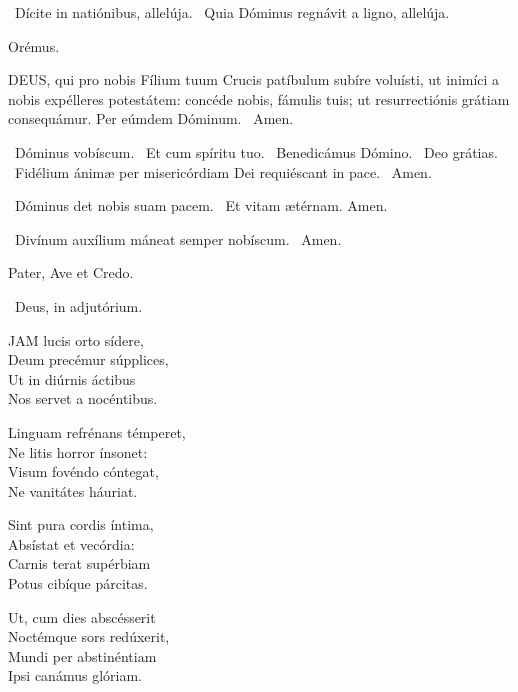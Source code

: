 \V\ Dícite in natiónibus, allelúja. \R\ Quia Dóminus regnávit a ligno, allelúja.

Orémus. 

\lettrine[lines=2]{D}{EUS}, qui pro nobis Fílium tuum Crucis patíbulum subíre voluísti, ut inimíci a nobis expélleres potestátem: concéde nobis, fámulis tuis; ut resurrectiónis grátiam consequámur. Per eúmdem Dóminum. \R\ Amen.


\V\ Dóminus vobíscum. \R\ Et cum spíritu tuo. \V\ Benedicámus Dómino. \R\ Deo grátias. \V\ Fidélium ánimæ per misericórdiam Dei requiéscant in pace. \R\ Amen.


\V\ Dóminus det nobis suam pacem. \R\ Et vitam ætérnam. Amen.



\V\ Divínum auxílium máneat semper nobíscum. \R\ Amen.


Pater, Ave et Credo.

\V\ Deus, in adjutórium.


\lettrine[lines=2]{J}{AM} lucis orto sídere,\\
Deum precémur súpplices,\\
Ut in diúrnis áctibus\\
Nos servet a nocéntibus.

Linguam refrénans témperet,\\
Ne litis horror ínsonet:\\
Visum fovéndo cóntegat,\\
Ne vanitátes háuriat.

Sint pura cordis íntima,\\
Absístat et vecórdia:\\
Carnis terat supérbiam\\
Potus cibíque párcitas.

Ut, cum dies abscésserit\\
Noctémque sors redúxerit,\\
Mundi per abstinéntiam\\
Ipsi canámus glóriam.

